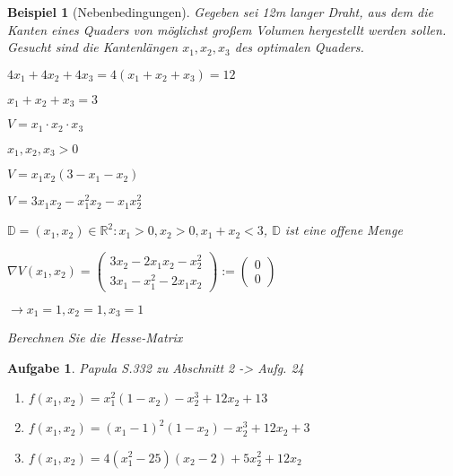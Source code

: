 \documentclass[12pt,a4paper]{scrreprt}
\newtheorem{beispiel}[defi]{Beispiel}
\newtheorem{aufg}[defi]{Aufgabe}
\begin{document}
\begin{beispiel}[Nebenbedingungen]
	Gegeben sei 12m langer Draht, aus dem die Kanten eines Quaders von möglichst großem Volumen hergestellt werden sollen. Gesucht sind die Kantenlängen $x_1,x_2,x_3$ des optimalen Quaders.
	
	$4x_1+4x_2+4x_3=4(x_1+x_2+x_3)=12$
	
	$x_1+x_2+x_3=3$
	
	$V=x_1\cdot x_2 \cdot x_3$
	
	$x_1,x_2,x_3 > 0$
	
	$V=x_1 x_2 (3-x_1-x_2)$
	
	$V=3x_1x_2-x_1^2x_2-x_1x_2^2$
	
	$\mathbb{D}={(x_1,x_2)\in\mathbb{R}^2:x_1>0,x_2>0,x_1+x_2<3}$, $\mathbb{D}$ ist eine offene Menge
	
	$\nabla V(x_1,x_2)=\begin{pmatrix}
	3x_2-2x_1x_2-x_2^2 \\
	3x_1-x_1^2-2x_1x_2
	\end{pmatrix} := \begin{pmatrix}
	0 \\ 0
	\end{pmatrix}$
	
	$\to x_1=1, x_2=1, x_3=1$
	
	Berechnen Sie die Hesse-Matrix
\end{beispiel}

\begin{aufg}
	Papula S.332 zu Abschnitt 2 -> Aufg. 24
	
	\begin{enumerate}
		\item $f(x_1,x_2)=x_1^2(1-x_2)-x_2^3+12x_2+13$
		\item $f(x_1,x_2)=(x_1-1)^2(1-x_2)-x_2^3+12x_2+3$
		\item $f(x_1,x_2)=4(x_1^2-25)(x_2-2)+5x_2^2+12x_2$
	\end{enumerate}
\end{aufg}
\end{document}
